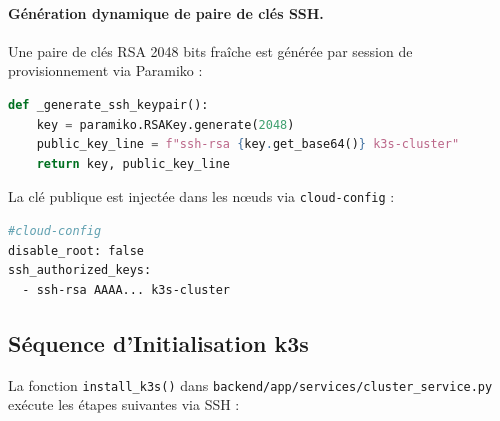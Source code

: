 \paragraph{Génération dynamique de paire de clés SSH.}
Une paire de clés RSA 2048 bits fraîche est générée par session de provisionnement
via Paramiko :

\begin{lstlisting}[language=python, caption={Génération de paire de clés RSA par cluster},
                   label={lst:keygen}]
def _generate_ssh_keypair():
    key = paramiko.RSAKey.generate(2048)
    public_key_line = f"ssh-rsa {key.get_base64()} k3s-cluster"
    return key, public_key_line
\end{lstlisting}

La clé publique est injectée dans les nœuds via \texttt{cloud-config} :

\begin{lstlisting}[language=bash, caption={user\_data cloud-init pour l'injection de clé SSH},
                   label={lst:cloudinit}]
#cloud-config
disable_root: false
ssh_authorized_keys:
  - ssh-rsa AAAA... k3s-cluster
\end{lstlisting}

\subsection{Séquence d'Initialisation k3s}

La fonction \texttt{install\_k3s()} dans
\texttt{backend/app/services/cluster\_service.py} exécute les étapes suivantes via SSH :

